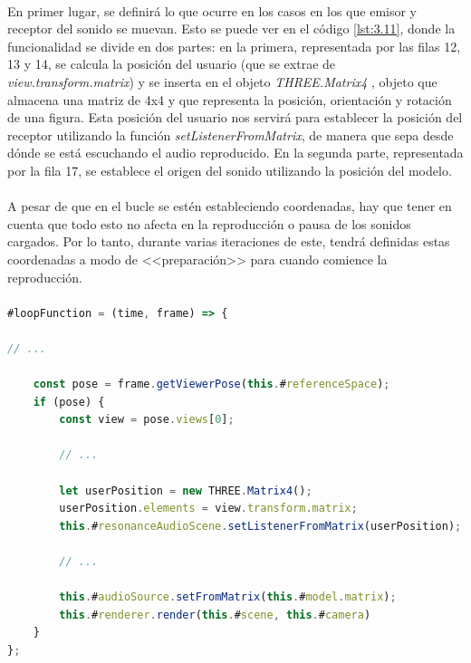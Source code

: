 \documentclass{subfiles}
\begin{document}
        \paragraph{}
        En primer lugar, se definirá lo que ocurre en los casos en los que emisor y receptor del sonido se muevan. Esto se puede ver en el código \ref{lst:3.11}, donde la funcionalidad se divide en dos partes: en la primera, representada por las filas 12, 13 y 14, se calcula la posición del usuario (que se extrae de \textit{view.transform.matrix}) y se inserta en el objeto \textit{THREE.Matrix4} \cite{web:threejs_matrix4}, objeto que almacena una matriz de 4x4 y que representa la posición, orientación y rotación de una figura. Esta posición del usuario nos servirá para establecer la posición del receptor utilizando la función \textit{setListenerFromMatrix}, de manera que \resonanceaudio sepa desde dónde se está escuchando el audio reproducido. En la segunda parte, representada por la fila 17, se establece el origen del sonido utilizando la posición del modelo.
        
        \paragraph{}
        A pesar de que en el bucle se estén estableciendo coordenadas, hay que tener en cuenta que todo esto no afecta en la reproducción o pausa de los sonidos cargados. Por lo tanto, durante varias iteraciones de este, \resonanceaudio tendrá definidas estas coordenadas a modo de <<preparación>> para cuando comience la reproducción.

\paragraph{}
\begin{lstlisting}[language=JavaScript, caption={Control del sonido espacial en el bucle.}, label={lst:3.11}]
#loopFunction = (time, frame) => {

// ...

    const pose = frame.getViewerPose(this.#referenceSpace);
    if (pose) {
        const view = pose.views[0];

        // ...

        let userPosition = new THREE.Matrix4();
        userPosition.elements = view.transform.matrix;
        this.#resonanceAudioScene.setListenerFromMatrix(userPosition);

        // ...

        this.#audioSource.setFromMatrix(this.#model.matrix);
        this.#renderer.render(this.#scene, this.#camera)
    }
};
\end{lstlisting}
\end{document}
